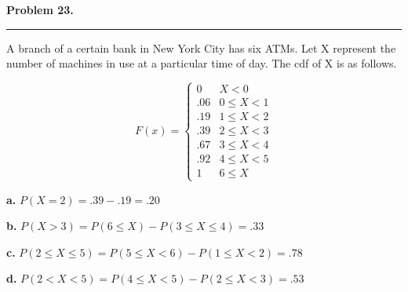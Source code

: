 \textbf{Problem 23.} \\
\hrule 

A branch of a certain bank in New York City has six ATMs. Let X represent the number of machines in use at a particular time of day. The cdf of X is as follows.

\[F(x) = \begin{cases}
    0 & X < 0 \\
    .06 & 0 \leq X < 1 \\
    .19 & 1 \leq X < 2 \\
    .39 & 2 \leq X < 3 \\
    .67 & 3 \leq X < 4 \\
    .92 & 4 \leq X < 5 \\
    1 & 6 \leq X
\end{cases} \]

\textbf{a.} 
$P(X = 2) = .39 - .19 = \boxed{.20}$

\textbf{b.}
$P(X > 3) = P(6 \leq X) - P(3 \leq X \leq 4) = \boxed{.33}$

\textbf{c.}
$P(2 \leq X \leq 5) = P(5 \leq X < 6) - P(1 \leq X < 2) = \boxed{.78}$ 

\textbf{d.}
$P(2 < X < 5) = P(4 \leq X < 5) - P(2 \leq X < 3) = \boxed{.53}$